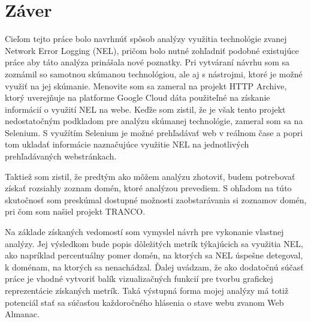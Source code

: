\chapter{Záver}
\label{zaver}

Cieľom tejto práce bolo navrhnúť spôsob analýzy využitia technológie zvanej Network Error Logging (NEL), pričom bolo nutné zohľadniť podobné existujúce práce aby táto analýza prinášala nové poznatky.
Pri vytváraní návrhu som sa zoznámil so samotnou skúmanou technológiou, ale aj s nástrojmi, ktoré je možné využiť na jej skúmanie.
Menovite som sa zameral na projekt HTTP Archive, ktorý uverejňuje na platforme Google Cloud dáta použiteľné na získanie informácií o využití NEL na webe.
Keďže som zistil, že je však tento projekt nedostatočným podkladom pre analýzu skúmanej technológie, zameral som sa na Selenium.
S využítím Selenium je možné prehľadávať web v reálnom čase a popri tom ukladať informácie naznačujúce využitie NEL na jednotlivých prehľadávaných webstránkach.

Taktiež som zistil, že predtým ako môžem analýzu zhotoviť, budem potrebovať získať rozsiahly zoznam domén, ktoré analýzou prevediem. 
S ohľadom na túto skutočnosť som preskúmal dostupné možnosti zaobstarávania si zoznamov domén, pri čom som našiel projekt TRANCO.

Na základe získaných vedomostí som vymyslel návrh pre vykonanie vlastnej analýzy.
Jej výsledkom bude popis dôležitých metrík týkajúcich sa využitia NEL, ako napríklad percentuálny pomer domén, na ktorých sa NEL úspešne detegoval, k doménam, na ktorých sa nenachádzal.
Ďalej uvádzam, že ako dodatočnú súčasť práce je vhodné vytvoriť balík vizualizačných funkcií pre tvorbu grafickej reprezentácie získaných metrík.
Taká výstupná forma mojej analýzy má totiž potenciál stať sa súčasťou každoročného hlásenia o stave webu zvanom Web Almanac. 
